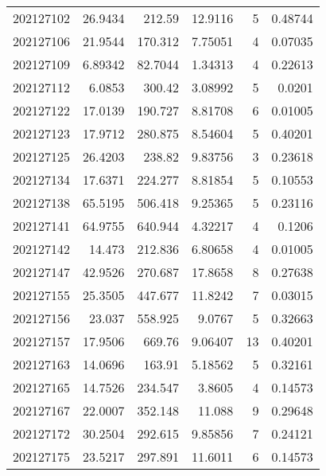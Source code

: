 \begin{tabular}{rrrrrr}
 202127102 &         26.9434  &      212.59   &           12.9116  &           5 & 0.48744 \\
 202127106 &         21.9544  &      170.312  &            7.75051 &           4 & 0.07035 \\
 202127109 &          6.89342 &       82.7044 &            1.34313 &           4 & 0.22613 \\
 202127112 &          6.0853  &      300.42   &            3.08992 &           5 & 0.0201  \\
 202127122 &         17.0139  &      190.727  &            8.81708 &           6 & 0.01005 \\
 202127123 &         17.9712  &      280.875  &            8.54604 &           5 & 0.40201 \\
 202127125 &         26.4203  &      238.82   &            9.83756 &           3 & 0.23618 \\
 202127134 &         17.6371  &      224.277  &            8.81854 &           5 & 0.10553 \\
 202127138 &         65.5195  &      506.418  &            9.25365 &           5 & 0.23116 \\
 202127141 &         64.9755  &      640.944  &            4.32217 &           4 & 0.1206  \\
 202127142 &         14.473   &      212.836  &            6.80658 &           4 & 0.01005 \\
 202127147 &         42.9526  &      270.687  &           17.8658  &           8 & 0.27638 \\
 202127155 &         25.3505  &      447.677  &           11.8242  &           7 & 0.03015 \\
 202127156 &         23.037   &      558.925  &            9.0767  &           5 & 0.32663 \\
 202127157 &         17.9506  &      669.76   &            9.06407 &          13 & 0.40201 \\
 202127163 &         14.0696  &      163.91   &            5.18562 &           5 & 0.32161 \\
 202127165 &         14.7526  &      234.547  &            3.8605  &           4 & 0.14573 \\
 202127167 &         22.0007  &      352.148  &           11.088   &           9 & 0.29648 \\
 202127172 &         30.2504  &      292.615  &            9.85856 &           7 & 0.24121 \\
 202127175 &         23.5217  &      297.891  &           11.6011  &           6 & 0.14573 \\

\end{tabular}
